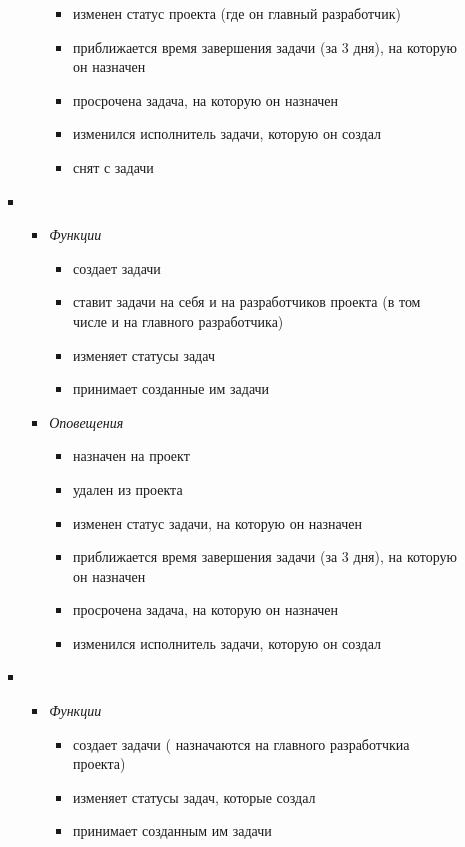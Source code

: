 \documentclass[14pt,a4paper]{extarticle}
\begin{document}
\begin{enumerate}
\begin{enumerate}
\begin{itemize}
\begin{itemize}
\begin{itemize}
						\item изменен статус проекта (где он главный разработчик)
						
						\item приближается время завершения задачи (за 3 дня), на которую он назначен
						
						\item просрочена задача, на которую он назначен
						
						\item изменился исполнитель задачи, которую он создал
						
						\item снят с задачи
					\end{itemize}
				\end{itemize}
				
				\item {}
				\begin{itemize}
					\item {\it Функции}
					\begin{itemize}
						\item создает задачи
						\item ставит задачи на себя и на разработчиков проекта (в том числе и на главного разработчика)
						\item изменяет статусы задач
						\item принимает созданные им задачи
					\end{itemize}
					
					\item {\it Оповещения}
					\begin{itemize}
						\item назначен на проект
						\item удален из проекта
						\item изменен статус задачи, на которую он назначен
						\item приближается время завершения задачи (за 3 дня), на которую он назначен
						\item просрочена задача, на которую он назначен
						\item изменился исполнитель задачи, которую он создал
					\end{itemize}
					
				\end{itemize}
				
				\item {}
				\begin{itemize}
					\item {\it Функции}
					\begin{itemize}
						\item создает задачи ({} назначаются на главного разработчкиа проекта)
						\item изменяет статусы задач, которые создал
						\item принимает созданным им задачи
					\end{itemize}
					

\end{itemize}
\end{itemize}
\end{enumerate}
\end{enumerate}
\end{document}
